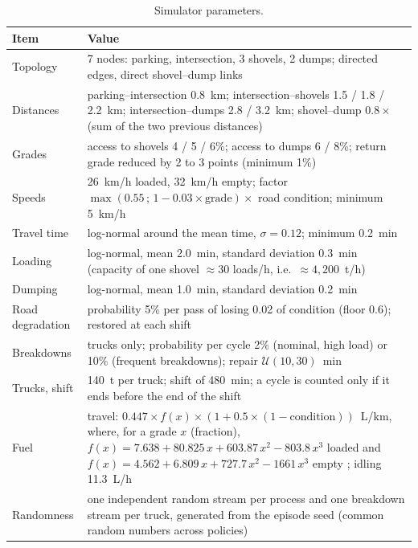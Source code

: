 \documentclass[11pt,a4paper]{article}
\newif\ifrevmarks
\newcommand{\revtag}[1]{\ifrevmarks\textsuperscript{\textcolor{red!70!black}{\scriptsize[#1]}}\fi}
\newcommand{\rev}[2]{\ifrevmarks{\color{revcolor}#2}\revtag{#1}\else#2\fi}
\begin{document}
\begin{table}[H]
\centering
\caption{\rev{M11}{Simulator parameters.}}
\label{tab:simparams}
\footnotesize
\begin{tabularx}{\textwidth}{>{\raggedright\arraybackslash}p{3.6cm}X}
\toprule
\textbf{Item} & \textbf{Value} \\
\midrule
Topology & 7 nodes: parking, intersection, 3 shovels, 2 dumps; directed edges, direct shovel--dump links \\
Distances & parking--intersection 0.8~km; intersection--shovels 1.5 / 1.8 / 2.2~km; intersection--dumps 2.8 / 3.2~km; shovel--dump $0.8\times$ (sum of the two previous distances) \\
Grades & access to shovels 4 / 5 / 6\%; access to dumps 6 / 8\%; return grade reduced by 2 to 3 points (minimum 1\%) \\
Speeds & 26~km/h loaded, 32~km/h empty; factor $\max(0.55\,;\,1-0.03\times\text{grade})\times$ road condition; minimum 5~km/h \\
Travel time & log-normal around the mean time, $\sigma=0.12$; minimum 0.2~min \\
Loading & log-normal, mean 2.0~min, standard deviation 0.3~min (capacity of one shovel $\approx 30$ loads/h, i.e.\ $\approx 4{,}200$~t/h) \\
Dumping & log-normal, mean 1.0~min, standard deviation 0.2~min \\
Road degradation & probability 5\% per pass of losing 0.02 of condition (floor 0.6); restored at each shift \\
Breakdowns & trucks only; probability per cycle 2\% (nominal, high load) or 10\% (frequent breakdowns); repair $\mathcal{U}(10,30)$~min \\
Trucks, shift & 140~t per truck; shift of 480~min; a cycle is counted only if it ends before the end of the shift \\
Fuel & \rev{v3}{travel: $0.447 \times f(x) \times (1+0.5\times(1-\text{condition}))$~L/km, where, for a grade $x$ (fraction), $f(x) = 7.638 + 80.825\,x + 603.87\,x^2 - 803.8\,x^3$ loaded and $f(x) = 4.562 + 6.809\,x + 727.7\,x^2 - 1661\,x^3$ empty \cite{Kubler2015}; idling 11.3~L/h \cite{Kubler2015}} \\
Randomness & \rev{v3}{one independent random stream per process and one breakdown stream per truck, generated from the episode seed (common random numbers across policies)} \\
\bottomrule
\end{tabularx}
\end{table}
\end{document}
